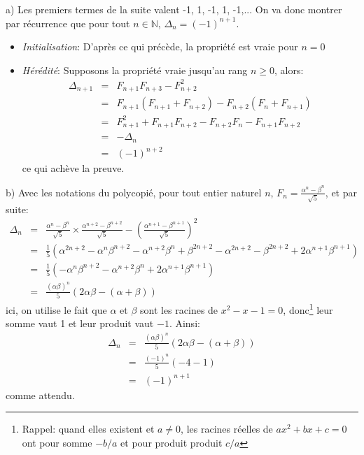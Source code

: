 a) Les premiers termes de la suite valent -1, 1, -1, 1, -1,... On va donc montrer par récurrence que pour tout $n\in\mathbb{N}$, $\Delta_n=(-1)^{n+1}$.
\begin{itemize}
  \item \textit{Initialisation}: D’après ce qui précède, la propriété est vraie pour $n=0$
  \item \textit{Hérédité}: Supposons la propriété vraie jusqu'au rang $n\geq 0$, alors:
  \begin{eqnarray*}
    \Delta_{n+1} &=& F_{n+1}F_{n+3}-F_{n+2}^2 \\
    &=& F_{n+1}(F_{n+1}+F_{n+2})-F_{n+2}(F_n+F_{n+1}) \\
    &=& F_{n+1}^2 +F_{n+1}F_{n+2}-F_{n+2}F_n-F_{n+1}F_{n+2} \\
    &=& -\Delta_n \\
    &=& (-1)^{n+2}
  \end{eqnarray*}
  ce qui achève la preuve.
\end{itemize}
b) Avec les notations du polycopié, pour tout entier naturel $n$, $F_n=\frac{\alpha^n-\beta^n}{\sqrt{5}}$, et par suite:
\begin{eqnarray*}
  \Delta_n &=& \frac{\alpha^n-\beta^n}{\sqrt{5}} \times \frac{\alpha^{n+2}-\beta^{n+2}}{\sqrt{5}} - \left( \frac{\alpha^{n+1}-\beta^{n+1}}{\sqrt{5}}\right)^2 \\
  &=& \frac{1}{5} \left( \alpha^{2n+2} - \alpha^n\beta^{n+2}-\alpha^{n+2}\beta^n + \beta^{2n+2} - \alpha^{2n+2} - \beta^{2n+2} + 2\alpha^{n+1}\beta^{n+1} \right) \\
  &=& \frac{1}{5} \left(- \alpha^n\beta^{n+2}-\alpha^{n+2}\beta^n + 2\alpha^{n+1}\beta^{n+1} \right) \\
  &=& \frac{(\alpha\beta)^n}{5}\left(2\alpha\beta - (\alpha+\beta)\right)
\end{eqnarray*}
ici, on utilise le fait que $\alpha$ et $\beta$ sont les racines de $x^2-x-1=0$, donc\footnote{Rappel: quand elles existent et $a\neq 0$, les racines réelles de $ax^2+bx+c=0$ ont pour somme $-b/a$ et pour produit produit $c/a$} leur somme vaut 1 et leur produit vaut $-1$. Ainsi:
\begin{eqnarray*}
  \Delta_n &=& \frac{(\alpha\beta)^n}{5}(2\alpha\beta - (\alpha+\beta)) \\
  &=& \frac{(-1)^n}{5}(-4-1) \\
  &=& (-1)^{n+1}
\end{eqnarray*}
comme attendu.
